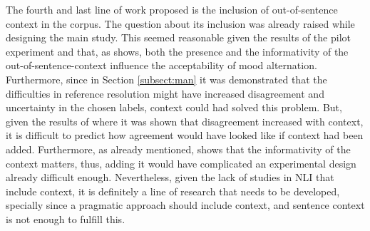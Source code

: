The fourth and last line of work proposed is the inclusion of out-of-sentence context in the corpus. The question about its inclusion was already raised while designing the main study. This seemed reasonable given the results of the pilot experiment and that, as \citet{faulkner2021systematic} shows, both the presence and the informativity of the out-of-sentence-context influence the acceptability of mood alternation. Furthermore, since in Section \ref{subsect:man} it was demonstrated that the difficulties in reference resolution might have increased disagreement and uncertainty in the chosen labels, context could had solved this problem. But, given the results of \citet{pavlick2019inherent} where it was shown that disagreement increased with context, it is difficult to predict how agreement would have looked like if context had been added. Furthermore, as already mentioned, \citet{faulkner2021systematic} shows that the informativity of the context matters, thus, adding it would have complicated an experimental design already difficult enough. Nevertheless, given the lack of studies in NLI that include context, it is definitely a line of research that needs to be developed, specially since a pragmatic approach should include context, and sentence context is not enough to fulfill this.\\